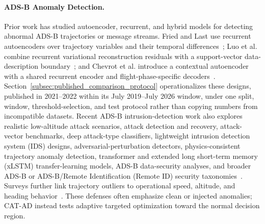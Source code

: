 \documentclass[runningheads]{llncs}
\begin{document}
\paragraph{ADS-B Anomaly Detection.}
Prior work has studied autoencoder, recurrent, and hybrid models for detecting abnormal ADS-B trajectories or message streams.
Fried and Last use recurrent autoencoders over trajectory variables and their temporal differences~\cite{fried2021autoencoders}; Luo et al. combine recurrent variational reconstruction residuals with a support-vector data-description boundary~\cite{luo2021vaesvdd}; and Chevrot et al. introduce a contextual autoencoder with a shared recurrent encoder and flight-phase-specific decoders~\cite{chevrot2022cae}.
Section~\ref{subsec:published_comparison_protocol} operationalizes these designs, published in 2021--2022 within its July 2019--July 2026 window, under one split, window, threshold-selection, and test protocol rather than copying numbers from incompatible datasets.
Recent ADS-B intrusion-detection work also explores realistic low-altitude attack scenarios, attack detection and recovery, attack-vector benchmarks, deep attack-type classifiers, lightweight intrusion detection system (IDS) designs, adversarial-perturbation detectors, physics-consistent trajectory anomaly detection, transformer and extended long short-term memory (xLSTM) transfer-learning models, ADS-B data-security analyses, and broader ADS-B or ADS-B/Remote Identification (Remote ID) security taxonomies~\cite{pirolley2026lowaltitude,yue2026ocren,cevik2025adsbanomalydetection,ahmed2025adsbanomalous,ahmed2026lightweightadsb,zhong2026rdpaadsb,zhao2026imdmpc,ngamboe2025adsbids,khan2025surveyadsbsecurity,zhang2025adsbdatasecurity,shi2026securityadsbrid,ahmed2026secureairtraffic}.
Surveys further link trajectory outliers to operational speed, altitude, and heading behavior~\cite{wu2026reviewtrajectory}.
These defenses often emphasize clean or injected anomalies; CAT-AD instead tests adaptive targeted optimization toward the normal decision region.
\end{document}
